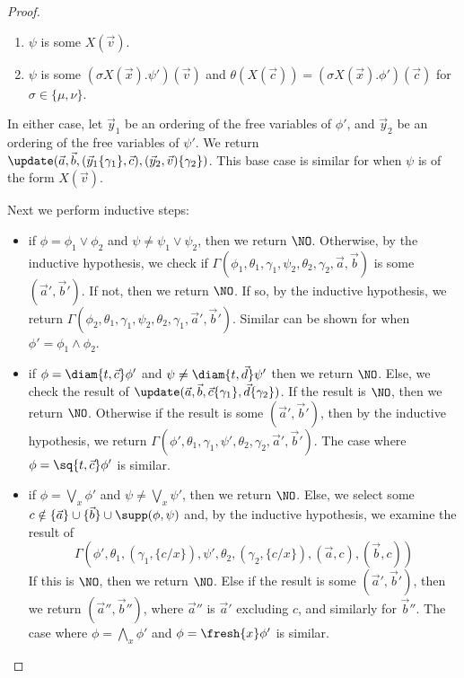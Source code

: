 \begin{proof}
\begin{itemize}
		\begin{enumerate}
			\item $\psi$ is some $X(\vec v)$.
						\item $\psi$ is some $(\sigma X(\vec x).\psi')(\vec v)$ and $\theta(X(\vec c)) = (\sigma X(\vec x).\phi')(\vec c)$ for $\sigma \in \{\mu, \nu\}$.
		\end{enumerate}
		In either case, 
		let $\vec y_1$ be an ordering of the free variables of $\phi'$, and $\vec y_2$ be an ordering of the free variables of $\psi'$. 
		We return $\update(\vec a, \vec b, (\vec y_1\{\gamma_1\}, \vec c), (\vec y_2, \vec v)\{\gamma_2\})$.
		This base case is similar for when $\psi$ is of the form $X(\vec v)$.
	\end{itemize}
	Next we perform inductive steps:
	\begin{itemize}
		\item if $\phi = \phi_1 \lor \phi_2$ and $\psi \neq \psi_1 \lor \psi_2$, then we return $\NO$. 
		Otherwise, by the inductive hypothesis, we check if $\Gamma(\phi_1, \theta_1, \gamma_1, \psi_2, \theta_2, \gamma_2, \vec a, \vec b)$ is some $(\vec a', \vec b')$. 
		If not, then we return $\NO$.
		If so, by the inductive hypothesis, we return $\Gamma(\phi_2, \theta_1, \gamma_1,\psi_2, \theta_2, \gamma_1, \vec a', \vec b')$.
		Similar can be shown for when $\phi' = \phi_1 \land \phi_2$.
				\item if $\phi = \diam{t, \vec c}\phi'$ and $\psi\neq \diam{t, \vec d}\psi'$ then we return $\NO$. 
		Else, we check the result of $\update(\vec a, \vec b, \vec c\{\gamma_1\}, \vec d\{\gamma_2\})$.
		If the result is $\NO$, then we return $\NO$. 
		Otherwise if the result is some $(\vec a', \vec b')$, then by the inductive hypothesis, we return $ \Gamma(\phi', \theta_1, \gamma_1, \psi', \theta_2,\gamma_2, \vec a', \vec b')$.
		The case where $\phi = \sq{t, \vec c}\phi'$ is similar.
				\item if $\phi = \bigvee_x \phi'$ and $\psi \neq \bigvee_x \psi'$, then we return $\NO$. 
		Else, we select some $c \notin \{\vec a\} \cup \{\vec b\} \cup \supp(\phi, \psi)$ and, by the inductive hypothesis,
		we examine the result of $$\Gamma(\phi', \theta_1, (\gamma_1, \{c/x\}), \psi', \theta_2, (\gamma_2, \{c/x\}), (\vec a, c), (\vec b, c))$$
		If this is $\NO$, then we return $\NO$. 
		Else if the result is some $(\vec a', \vec b')$, then we return $(\vec a'', \vec b'')$, where $\vec a''$ is $\vec a'$ excluding $c$, and similarly for $\vec b''$.
		The case where $\phi = \bigwedge_x \phi'$ and $\phi = \fresh{x}\phi'$ is similar.

\end{itemize}
\end{proof}
